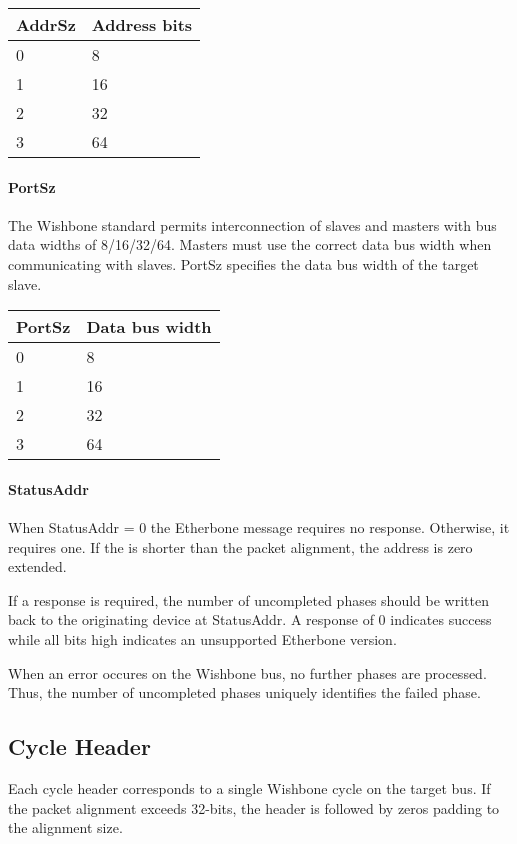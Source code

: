 \documentclass{article}
\begin{document}
\vspace{1em}
\begin{tabular}{|l|l|}
\hline
AddrSz & Address bits \\
\hline
0 & 8 \\
1 & 16 \\
2 & 32 \\
3 & 64 \\
\hline
\end{tabular}

\paragraph{PortSz} \label{field:PortSz}
The Wishbone standard permits interconnection of slaves and masters 
with bus data widths of 8/16/32/64.
Masters must use the correct data bus width when communicating with slaves.
PortSz specifies the data bus width of the target slave.

\vspace{1em}
\begin{tabular}{|l|l|}
\hline
PortSz & Data bus width \\
\hline
0 & 8 \\
1 & 16 \\
2 & 32 \\
3 & 64 \\
\hline
\end{tabular}

\paragraph{StatusAddr} \label{field:StatusAddr}
When StatusAddr = 0 the Etherbone message requires no response.
Otherwise, it requires one.
If the  is shorter than the packet alignment, 
the address is zero extended.

If a response is required,
the number of uncompleted phases should be written back to the originating
device at StatusAddr.
A response of 0 indicates success while
all bits high indicates an unsupported Etherbone version.

When an error occures on the Wishbone bus,
no further phases are processed.
Thus,
the number of uncompleted phases uniquely identifies the failed phase.

\subsection{Cycle Header}

Each cycle header corresponds to a single Wishbone cycle on the target bus.
If the packet alignment exceeds 32-bits, 
the header is followed by zeros padding to the alignment size.
\end{document}
